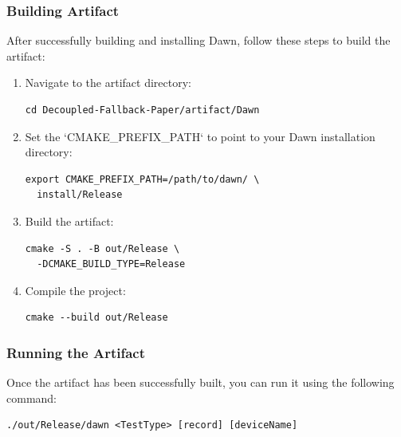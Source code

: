 \documentclass[sigconf]{acmart}
\begin{document}
\subsubsection{Building Artifact}
After successfully building and installing Dawn, follow these steps to build the artifact:

\begin{enumerate}
  \item Navigate to the artifact directory:
  \begin{lstlisting}[basicstyle=\ttfamily\small, frame=single]
cd Decoupled-Fallback-Paper/artifact/Dawn
  \end{lstlisting}
  
  \item Set the `CMAKE\_PREFIX\_PATH` to point to your Dawn installation directory:
  \begin{lstlisting}[basicstyle=\ttfamily\small, frame=single]
export CMAKE_PREFIX_PATH=/path/to/dawn/ \  
  install/Release
  \end{lstlisting}
  
  \item Build the artifact:
  \begin{lstlisting}[basicstyle=\ttfamily\small, frame=single]
cmake -S . -B out/Release \
  -DCMAKE_BUILD_TYPE=Release
  \end{lstlisting}
  
  \item Compile the project:
  \begin{lstlisting}[basicstyle=\ttfamily\small, frame=single]
cmake --build out/Release
  \end{lstlisting}
\end{enumerate}

\subsubsection{Running the Artifact}
Once the artifact has been successfully built, you can run it using the following command:

\begin{lstlisting}[basicstyle=\ttfamily\small, frame=single]
./out/Release/dawn <TestType> [record] [deviceName]
\end{lstlisting}
\end{document}
